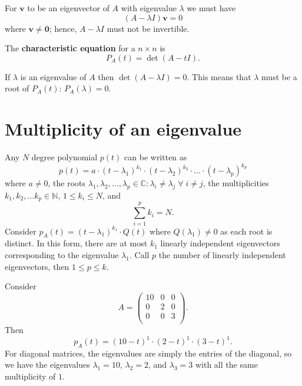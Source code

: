 For $\bm{v}$ to be an eigenvector of $A$ with eigenvalue $\lambda$ we must have \[ (A - \lambda I) \bm{v} = 0 \] where $\bm{v} \neq \bm{0}$; hence, $A - \lambda I$ must not be invertible.

\begin{definition}
    The \textbf{characteristic equation} for a $n \times n$ is \[ P_A(t) = \det{(A - tI)}. \]
\end{definition}

If $\lambda$ is an eigenvalue of $A$ then $\det{(A - \lambda I)} = 0$. This means that $\lambda$ must be a root of $P_A(t)$: $P_A(\lambda) = 0$. 

\section{Multiplicity of an eigenvalue}

Any $N$ degree polynomial $p(t)$ can be written as \[ p(t) = a \cdot (t - \lambda_1)^{k_1} \cdot (t - \lambda_2)^{k_2} \cdot \ldots \cdot (t - \lambda_p)^{k_p} \] where $a \neq 0$, the roots $\lambda_1, \lambda_2, \ldots, \lambda_p \in \mathbb{C} : \lambda_i \neq \lambda_j \; \forall \; i \neq j$, the multiplicities $k_1, k_2, \ldots k_p \in \mathbb{N}$, $1 \leq k_i \leq N$, and \[ \sum_{i = 1}^p k_i = N. \] Consider $p_A(t) = (t - \lambda_1)^{k_1} \cdot Q(t)$ where $Q(\lambda_1) \neq 0$ as each root is distinct. In this form, there are at most $k_1$ linearly independent eigenvectors corresponding to the eigenvalue $\lambda_1$. Call $p$ the number of linearly independent eigenvectors, then $1 \leq p \leq k$.

\begin{example}
    Consider
    \[
        A =
        \begin{pmatrix}
            10 & 0 & 0 \\
            0 & 2 & 0 \\
            0 & 0 & 3 \\
        \end{pmatrix}
        .
    \]
    Then \[ p_A(t) = (10 - t)^1 \cdot (2 - t)^1 \cdot (3 - t)^1. \] For diagonal matrices, the eigenvalues are simply the entries of the diagonal, so we have the eigenvalues $\lambda_1 = 10$, $\lambda_2 = 2$, and $\lambda_3 = 3$ with all the same multiplicity of $1$.
\end{example}

